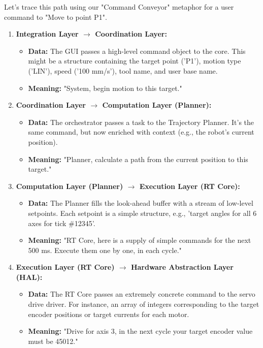 Let's trace this path using our "Command Conveyor" metaphor for a user command to "Move to point P1".
\begin{enumerate}
    \item \textbf{Integration Layer $\rightarrow$ Coordination Layer:}
    \begin{itemize}
        \item \textbf{Data:} The GUI passes a high-level command object to the core. This might be a structure containing the target point ('P1'), motion type ('LIN'), speed ('100 mm/s'), tool name, and user base name.
        \item \textbf{Meaning:} "System, begin motion to this target."
    \end{itemize}
    
    \item \textbf{Coordination Layer $\rightarrow$ Computation Layer (Planner):}
    \begin{itemize}
        \item \textbf{Data:} The orchestrator passes a task to the Trajectory Planner. It's the same command, but now enriched with context (e.g., the robot's current position).
        \item \textbf{Meaning:} "Planner, calculate a path from the current position to this target."
    \end{itemize}

    \item \textbf{Computation Layer (Planner) $\rightarrow$ Execution Layer (RT Core):}
    \begin{itemize}
        \item \textbf{Data:} The Planner fills the look-ahead buffer with a stream of low-level setpoints. Each setpoint is a simple structure, e.g., 'target angles for all 6 axes for tick \#12345'.
        \item \textbf{Meaning:} "RT Core, here is a supply of simple commands for the next 500 ms. Execute them one by one, in each cycle."
    \end{itemize}

    \item \textbf{Execution Layer (RT Core) $\rightarrow$ Hardware Abstraction Layer (HAL):}
    \begin{itemize}
        \item \textbf{Data:} The RT Core passes an extremely concrete command to the servo drive driver. For instance, an array of integers corresponding to the target encoder positions or target currents for each motor.
        \item \textbf{Meaning:} "Drive for axis 3, in the next cycle your target encoder value must be 45012."
    \end{itemize}
\end{enumerate}

